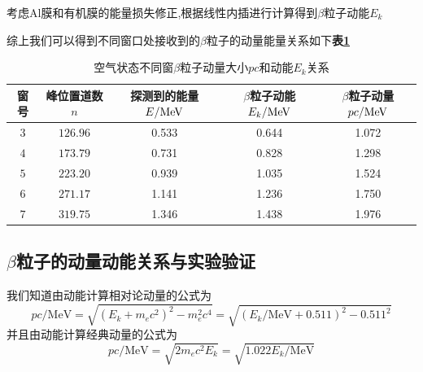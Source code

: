 \documentclass[a4paper]{article}
\begin{document}
考虑Al膜和有机膜的能量损失修正,根据线性内插进行计算得到$\beta$粒子动能$E_k$

综上我们可以得到不同窗口处接收到的$\beta$粒子的动量能量关系如下\textbf{表\ref{tab:3}}
\begin{table}[H]
\setlength{\tabcolsep}{3mm}
\caption{空气状态不同窗$\beta$粒子动量大小$pc$和动能$E_k$关系}\label{tab:3}
\begin{center}\begin{tabular}{|c|c|c|c|c|}
	\toprule
	\hline
	\textbf{窗号} & \textbf{峰位置道数$n$} & \textbf{探测到的能量$E/\rm MeV$} & \textbf{$\beta$粒子动能$E_k/\rm MeV$} & \textbf{$\beta$粒子动量$pc/\rm MeV$}\\ \hline \hline
	$3$ & $126.96$ & 0.533 & 0.644 & 1.072\\ \hline
	$4$ & $173.79$ & 0.731 & 0.828 & 1.298\\ \hline
	$5$ & $223.20$ & 0.939 & 1.035 & 1.524\\ \hline
	$6$ & $271.17$ & 1.141 & 1.236 & 1.750\\ \hline
	$7$ & $319.75$ & 1.346 & 1.438 & 1.976\\ \hline
	\bottomrule
	\end{tabular}
\end{center}
\end{table}
\newpage
\subsection{$\beta$粒子的动量动能关系与实验验证}\label{sub:4}
我们知道由动能计算相对论动量的公式为
\begin{equation}
    pc/\mathrm{MeV}=\sqrt{(E_k+m_e c^2)^2-m^2_e c^4}=\sqrt{(E_k/\mathrm{MeV}+0.511)^2-0.511^2}
\end{equation}
并且由动能计算经典动量的公式为
\begin{equation}
     pc/\mathrm{MeV}=\sqrt{2m_e c^2 E_k}=\sqrt{1.022E_k/\mathrm{MeV}}
\end{equation}
\end{document}
